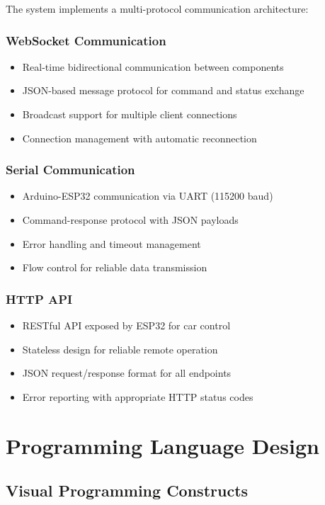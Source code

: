 The system implements a multi-protocol communication architecture:

\subsubsection{WebSocket Communication}
\begin{itemize}
    \item Real-time bidirectional communication between components
    \item JSON-based message protocol for command and status exchange
    \item Broadcast support for multiple client connections
    \item Connection management with automatic reconnection
\end{itemize}

\subsubsection{Serial Communication}
\begin{itemize}
    \item Arduino-ESP32 communication via UART (115200 baud)
    \item Command-response protocol with JSON payloads
    \item Error handling and timeout management
    \item Flow control for reliable data transmission
\end{itemize}

\subsubsection{HTTP API}
\begin{itemize}
    \item RESTful API exposed by ESP32 for car control
    \item Stateless design for reliable remote operation
    \item JSON request/response format for all endpoints
    \item Error reporting with appropriate HTTP status codes
\end{itemize}

\section{Programming Language Design}

\subsection{Visual Programming Constructs}

